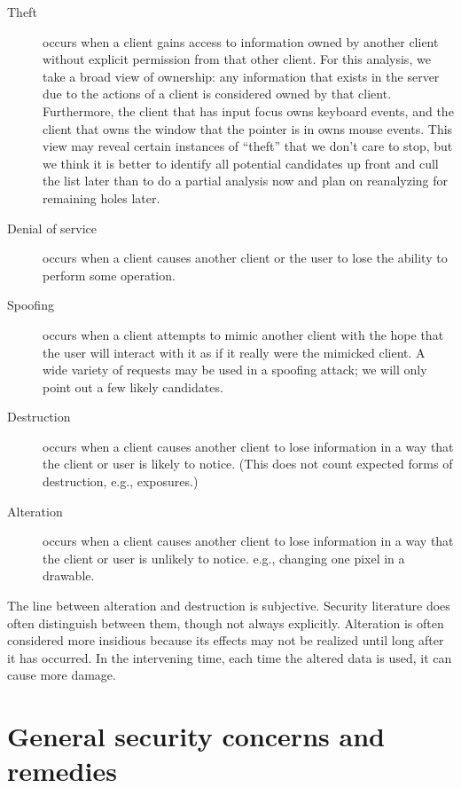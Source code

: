 \documentclass{article}
\begin{document}
\begin{description}

\item[Theft] occurs when a client gains access to information owned by
another client without explicit permission from that other client.
For this analysis, we take a broad view of ownership: any information
that exists in the server due to the actions of a client is considered
owned by that client.  Furthermore, the client that has input focus
owns keyboard events, and the client that owns the window that the
pointer is in owns mouse events.  This view may reveal certain
instances of ``theft'' that we don't care to stop, but we think it is
better to identify all potential candidates up front and cull the list
later than to do a partial analysis now and plan on reanalyzing for
remaining holes later.

\item[Denial of service] occurs when a client causes another client or
the user to lose the ability to perform some operation.

\item[Spoofing] occurs when a client attempts to mimic another client
with the hope that the user will interact with it as if it really were
the mimicked client.  A wide variety of requests may be used in a
spoofing attack; we will only point out a few likely candidates.

\item[Destruction] occurs when a client causes another client to lose
information in a way that the client or user is likely to notice.
(This does not count expected forms of destruction, e.g., exposures.)

\item[Alteration] occurs when a client causes another client to lose
information in a way that the client or user is unlikely to
notice. e.g., changing one pixel in a drawable.

\end{description}

The line between alteration and destruction is subjective.  Security
literature does often distinguish between them, though not always
explicitly.  Alteration is often considered more insidious because its
effects may not be realized until long after it has occurred.  In the
intervening time, each time the altered data is used, it can cause
more damage.



\section{General security concerns and remedies}
\end{document}
